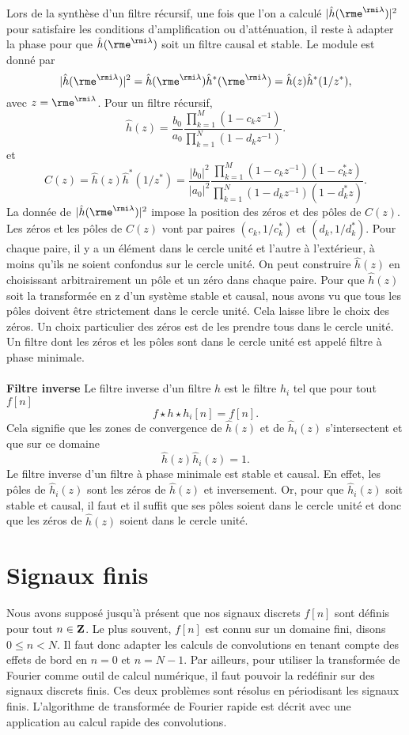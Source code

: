 Lors de la synth\`ese d'un filtre r\'ecursif,
une fois que l'on a calcul\'e
$|\hat h({\rme^{\rmi \lambda}})|^2$ pour satisfaire les conditions d'amplification
ou d'att\'enuation, il reste \`a
adapter la phase pour que $\hat h ({\rme^{\rmi \lambda}})$ soit un filtre
causal et stable. Le module est donn\'e par
\[
|\hat h({\rme^{\rmi \lambda}})|^2 = \hat h({\rme^{\rmi \lambda}}) \hat h^* ({\rme^{\rmi \lambda}}) = \hat h(z)
\hat h^* (1 / z^* ) ,
\]
avec $z = {\rme^{\rmi \lambda}}$.
Pour un filtre r\'ecursif,
\[
\hat h(z) = \frac {b_0} {a_0} \frac
{\prod_{k=1}^M (1 - c_k z^{-1})} {\prod_{k=1}^N (1 - d_k z^{-1})} .
\]
et
\[
C(z) = \hat h(z) \hat h^* (1 / z^* ) =
\frac {|b_0|^2} {|a_0|^2} \frac
{\prod_{k=1}^M (1 - c_k z^{-1})(1 -  c^*_k  z)
} {\prod_{k=1}^N (1 - d_k z^{-1})(1 - d^*_k z)} .
\]
La donn\'ee de $|\hat h({\rme^{\rmi \lambda}})|^2$ impose la position des z\'eros et
des p\^oles de $C(z)$. Les z\'eros et les p\^oles de $C(z)$
vont par paires $(c_k, 1/{ c^*_k})$ et
$(d_k, 1/{d^*_k})$. Pour chaque paire, il y a un \'el\'ement
dans le cercle unit\'e et l'autre \`a l'ext\'erieur, \`a moins qu'ils
ne soient confondus sur le cercle unit\'e.
On peut construire $\hat h(z)$ en choisissant
arbitrairement un p\^ole et un z\'ero dans
chaque paire.
Pour que $\hat h(z)$ soit la transform\'ee en z d'un syst\`eme
stable
et causal, nous avons vu que tous les p\^oles doivent \^etre
strictement dans le
cercle unit\'e. Cela laisse libre le choix des z\'eros.
Un choix particulier des z\'eros est de les prendre tous
dans le cercle unit\'e. Un filtre dont les z\'eros et les p\^oles
sont dans le cercle unit\'e est appel\'e filtre \`a phase minimale.
\\
\\
{\bf Filtre inverse}
Le filtre inverse d'un filtre $h$ est
le filtre $h_i$ tel que
pour tout $f[n]$
\[
f \star h \star h_i [n] = f[n] .
\]
Cela signifie que les zones de convergence
de $\hat h (z)$ et de $\hat h_i (z)$ s'intersectent et que
sur ce domaine
\[
\hat h(z) \hat h_i (z) = 1.
\]
Le filtre inverse d'un filtre \`a phase minimale
est stable et causal.
En effet,
les p\^oles de $\hat h_i (z)$ sont les z\'eros
de $\hat h(z)$ et inversement.
Or, pour que $\hat h_i (z)$ soit stable et causal, il faut et
il suffit que ses
p\^oles soient dans le cercle unit\'e et donc que les z\'eros de
$\hat h(z)$ soient dans le cercle unit\'e.

\section{Signaux finis}
\label{finite-sig}
Nous avons suppos\'e jusqu'\`a pr\'esent que nos signaux discrets
$f[n]$ sont d\'efinis pour tout $n \in {\bf{Z}}$. Le plus souvent,
$f[n]$ est connu sur un domaine fini, disons $0 \leq n < N$.
Il faut donc adapter les calculs de convolutions en tenant
compte des effets de bord en $n=0$ et $n= N-1$.
Par ailleurs, pour utiliser la transform\'ee de Fourier comme outil
de calcul num\'erique, il faut pouvoir la red\'efinir sur des
signaux discrets finis.
Ces deux probl\`emes sont r\'esolus en p\'eriodisant les
signaux finis. L'algorithme de transform\'ee de Fourier
rapide est d\'ecrit avec une application au calcul rapide
des convolutions.


